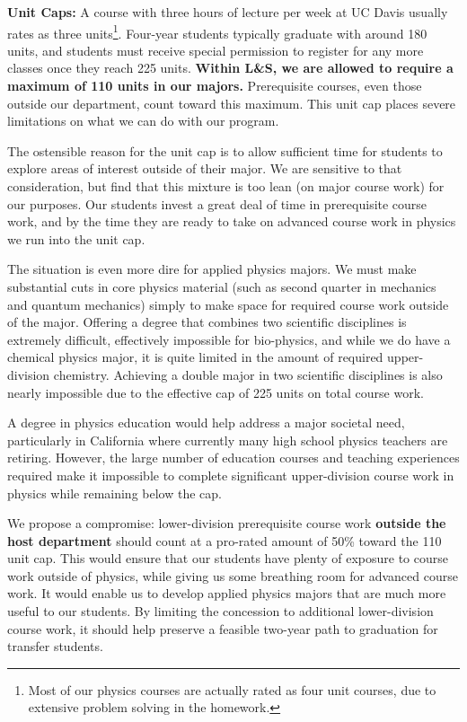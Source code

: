 \documentclass[12pt]{article}
\begin{document}
\noindent
{\bf Unit Caps:} A course with three hours of lecture per week
at UC Davis usually rates as three units\footnote{Most of our physics courses
  are actually rated as four unit courses, due to extensive problem
  solving in the homework.}.  Four-year students typically graduate
with around 180 units, and students must receive special permission to
register for any more classes once they reach 225 units.  {\bf Within
  L\&S, we are allowed to require a maximum of 110 units in our
  majors.} Prerequisite courses, even those outside our department,
count toward this maximum.  This unit cap places severe limitations on
what we can do with our program.

The ostensible reason for the unit cap is to allow sufficient time for
students to explore areas of interest outside of their major.  We are
sensitive to that consideration, but find that this mixture is too
lean (on major course work) for our purposes.  Our students invest a
great deal of time in prerequisite course work, and by the time they
are ready to take on advanced course work in physics we run into the
unit cap.

The situation is even more dire for applied physics majors.  We must
make substantial cuts in core physics material (such as second quarter
in mechanics and quantum mechanics) simply to make space for required
course work outside of the major.  Offering a degree that combines
two scientific disciplines is extremely difficult, effectively
impossible for bio-physics, and while we do have a chemical physics major,
it is quite limited in the amount of required upper-division chemistry.
Achieving a double major in two scientific disciplines is also nearly
impossible due to the effective cap of 225 units on total course work.

A degree in physics education would help address a major societal
need, particularly in California where currently many high school
physics teachers are retiring.  However, the large number of education
courses and teaching experiences required make it impossible to
complete significant upper-division course work in physics while
remaining below the cap.

We propose a compromise: lower-division prerequisite course work {\bf
  outside the host department} should count at a pro-rated amount of
50\% toward the 110 unit cap.  This would ensure that our students
have plenty of exposure to course work outside of physics, while
giving us some breathing room for advanced course work.  It would
enable us to develop applied physics majors that are much more useful
to our students.  By limiting the concession to additional
lower-division course work, it should help preserve a feasible
two-year path to graduation for transfer students.
\end{document}
